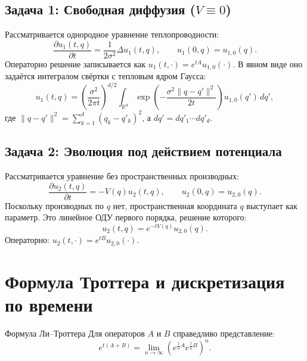 \documentclass[12pt,a4paper]{article}
\begin{document}
\subsection{Задача 1: Свободная диффузия ($V \equiv 0$)}
Рассматривается однородное уравнение теплопроводности:
\begin{equation}
    \frac{\partial u_1(t, q)}{\partial t} = \frac{1}{2\sigma^2} \Delta u_1(t, q), \qquad u_1(0, q) = u_{1,0}(q).
\end{equation}
Операторно решение записывается как $u_1(t, \cdot) = e^{tA} u_{1,0}(\cdot)$. В явном виде оно задаётся интегралом свёртки с тепловым ядром Гаусса:
\begin{equation}
    \label{eq:heat_kernel_sol}
    u_1(t, q) = \left(\frac{\sigma^2}{2\pi t}\right)^{\!\!d/2} \int_{\mathbb{R}^d} \exp\!\left( -\frac{\sigma^2 \|q - q'\|^2}{2t} \right) u_{1,0}(q')\, dq',
\end{equation}
где $\|q - q'\|^2 = \sum\limits_{k=1}^d (q_k - q'_k)^2$, а $dq' = dq'_1 \cdots dq'_d$.

\subsection{Задача 2: Эволюция под действием потенциала}
Рассматривается уравнение без пространственных производных:
\begin{equation}
    \frac{\partial u_2(t, q)}{\partial t} = -V(q) u_2(t, q), \qquad u_2(0, q) = u_{2,0}(q).
\end{equation}
Поскольку производных по $q$ нет, пространственная координата $q$ выступает как параметр. Это линейное ОДУ первого порядка, решение которого:
\begin{equation}
    u_2(t, q) = e^{-t V(q)} u_{2,0}(q).
\end{equation}
Операторно: $u_2(t, \cdot) = e^{tB} u_{2,0}(\cdot)$.



\section{Формула Троттера и дискретизация по времени}

\begin{theorybox}{Формула Ли--Троттера}
Для операторов $A$ и $B$ справедливо представление:
\begin{equation}
    e^{t(A+B)} = \lim_{n \to \infty} \left( e^{\frac{t}{n}A} e^{\frac{t}{n}B} \right)^{\!\!n}.
\end{equation}
\end{theorybox}
\end{document}

